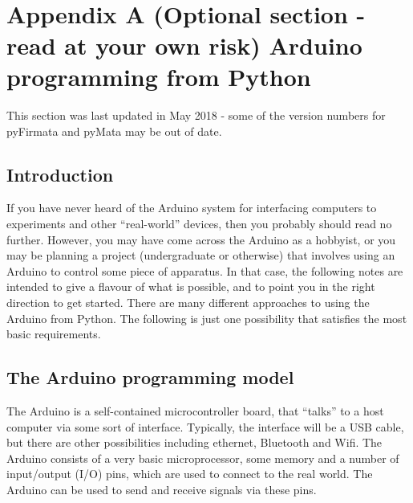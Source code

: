 \documentclass[10pt]{article}
\begin{document}
    \begin{center}
    \end{center}
    { \hspace*{\fill} \\}
    
    \hypertarget{appendix-a-optional-section---read-at-your-own-risk}{%
\section*{Appendix A (Optional section - read at your own
risk) Arduino programming from
Python}\label{appendix-a-optional-section---read-at-your-own-risk}}

\hypertarget{arduino-programming-from-python}{%
\label{arduino-programming-from-python}}

This section was last updated in May 2018 - some of the version numbers
for pyFirmata and pyMata may be out of date.

\hypertarget{a.1-introduction}{%
\renewcommand{\thesubsection}{A.\arabic{subsection}}
\setcounter{subsection}{0} \subsection{Introduction}\label{a.1-introduction}}

If you have never heard of the Arduino system for interfacing computers
to experiments and other ``real-world'' devices, then you probably
should read no further. However, you may have come across the Arduino as
a hobbyist, or you may be planning a project (undergraduate or
otherwise) that involves using an Arduino to control some piece of
apparatus. In that case, the following notes are intended to give a
flavour of what is possible, and to point you in the right direction to
get started. There are many different approaches to using the Arduino
from Python. The following is just one possibility that satisfies the
most basic requirements.

    \hypertarget{a.2-the-arduino-programming-model}{%
\subsection{The Arduino programming
model}\label{a.2-the-arduino-programming-model}}

The Arduino is a self-contained microcontroller board, that ``talks'' to
a host computer via some sort of interface. Typically, the interface
will be a USB cable, but there are other possibilities including
ethernet, Bluetooth and Wifi. The Arduino consists of a very basic
microprocessor, some memory and a number of input/output (I/O) pins,
which are used to connect to the real world. The Arduino can be used to
send and receive signals via these pins.
\end{document}
